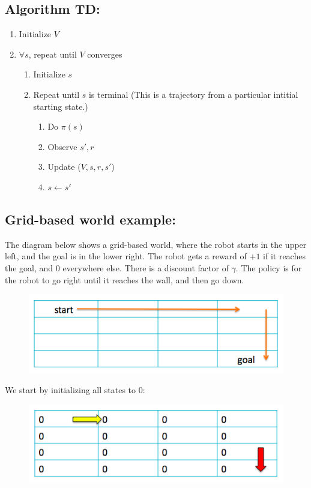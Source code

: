 \documentclass[11pt]{article}
\numberwithin{equation}{section}
\numberwithin{figure}{section}
\begin{document}
\subsection*{Algorithm TD:}

\begin{enumerate}
	\item Initialize $V$
	\item $\forall s$, repeat until $V$ converges
	\begin{enumerate}
		\item Initialize $s$
		\item Repeat until $s$ is terminal (This is a trajectory from a particular intitial starting state.)
		\begin{enumerate}
			\item Do $\pi(s)$
			\item Observe $s', r$
			\item Update ($V, s, r, s'$)
			\label{step.updateTD}
			\item $s \leftarrow s'$
		\end{enumerate}		
	\end{enumerate}		
\end{enumerate}		

\subsection*{Grid-based world example:}
The diagram below shows a grid-based world, where the robot starts in the upper left, and the goal is in the lower right.  The robot gets a reward of $+1$ if it reaches the goal, and $0$ everywhere else.  There is a discount factor of $\gamma$.  The policy is for the robot to go right until it reaches the wall, and then go down.
\begin{figure}[h!]
	\centering
	\includegraphics[width=.4\columnwidth]{./images/fig1}
	\label{fig.fig1}
\end{figure}

We start by initializing all states to 0:

\begin{figure}[h!]
	\centering
	\includegraphics[width=.4\columnwidth]{./images/fig2}
	\label{fig.fig2}
\end{figure}
\end{document}
